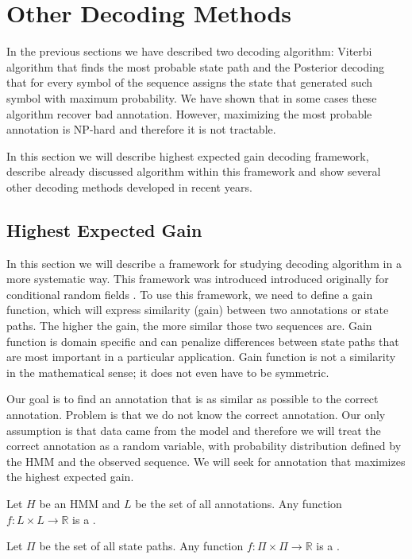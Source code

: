 \section{Other Decoding Methods}
In the previous sections we have described two decoding algorithm: Viterbi algorithm
that finds the most probable state path  and the Posterior decoding that for
every symbol of the sequence assigns the state that generated such symbol with
maximum probability. 
We have shown that in some cases these algorithm recover bad
annotation. However, maximizing the most probable annotation is NP-hard and
therefore it is not tractable.

In this section we will describe highest expected gain decoding framework,
describe already discussed algorithm within this framework and show several
other decoding methods developed in recent years.

\subsection{Highest Expected Gain}

\label{SECTION:HEG}

In this section we will describe a framework for studying decoding algorithm in
a more systematic way. This framework was introduced introduced originally for
conditional random fields \cite{Gross2007}.  To use this framework, we need to
define a gain function, which will express similarity (gain) between two
annotations or state paths. The higher the gain, the more similar those two
sequences are. Gain function is domain specific and can penalize differences
between state paths that are most important in a particular application.  Gain
function is not a similarity in the mathematical sense; it does not even have to
be symmetric.

Our goal is to find an annotation that is as similar as possible to the correct
annotation. Problem is that we do not know the correct annotation. Our only
assumption is that data came from the model and therefore we will treat the
correct annotation as a random variable, with probability distribution defined
by the HMM and the observed sequence. We will seek for annotation that maximizes
the highest expected gain.

\begin{definition}
Let $H$ be an HMM and $L$ be the set of all annotations. Any function
$f:L\times L\to \mathbb{R}$ is a .

Let $\Pi$ be the set of all state paths. Any function $f:\Pi\times
\Pi\to\mathbb{R}$ is a .

\end{definition}

